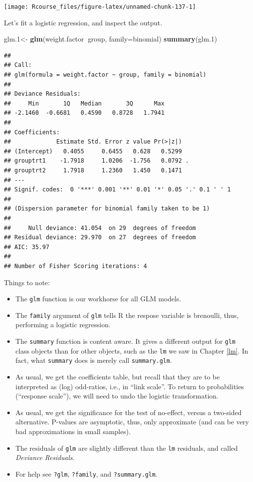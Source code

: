 \documentclass[]{book}
\newenvironment{Shaded}{\begin{snugshade}}{\end{snugshade}}
\newcommand{\KeywordTok}[1]{\textcolor[rgb]{0.13,0.29,0.53}{\textbf{#1}}}
\newcommand{\DataTypeTok}[1]{\textcolor[rgb]{0.13,0.29,0.53}{#1}}
\newcommand{\DecValTok}[1]{\textcolor[rgb]{0.00,0.00,0.81}{#1}}
\newcommand{\StringTok}[1]{\textcolor[rgb]{0.31,0.60,0.02}{#1}}
\newcommand{\OperatorTok}[1]{\textcolor[rgb]{0.81,0.36,0.00}{\textbf{#1}}}
\newcommand{\NormalTok}[1]{#1}
\providecommand{\tightlist}{%
  \setlength{\itemsep}{0pt}\setlength{\parskip}{0pt}}
\theoremstyle{definition}
\theoremstyle{definition}
\theoremstyle{definition}
\theoremstyle{remark}
\begin{document}
\texttt{[image: Rcourse\_files/figure-latex/unnamed-chunk-137-1]}

Let's fit a logistic regression, and inspect the output.

\begin{Shaded}
\begin{Highlighting}[]
\NormalTok{glm.}\DecValTok{1}\NormalTok{<-}\StringTok{ }\KeywordTok{glm}\NormalTok{(weight.factor}\OperatorTok{~}\NormalTok{group, }\DataTypeTok{family=}\NormalTok{binomial)}
\KeywordTok{summary}\NormalTok{(glm.}\DecValTok{1}\NormalTok{)}
\end{Highlighting}
\end{Shaded}

\begin{verbatim}
## 
## Call:
## glm(formula = weight.factor ~ group, family = binomial)
## 
## Deviance Residuals: 
##     Min       1Q   Median       3Q      Max  
## -2.1460  -0.6681   0.4590   0.8728   1.7941  
## 
## Coefficients:
##             Estimate Std. Error z value Pr(>|z|)  
## (Intercept)   0.4055     0.6455   0.628   0.5299  
## grouptrt1    -1.7918     1.0206  -1.756   0.0792 .
## grouptrt2     1.7918     1.2360   1.450   0.1471  
## ---
## Signif. codes:  0 '***' 0.001 '**' 0.01 '*' 0.05 '.' 0.1 ' ' 1
## 
## (Dispersion parameter for binomial family taken to be 1)
## 
##     Null deviance: 41.054  on 29  degrees of freedom
## Residual deviance: 29.970  on 27  degrees of freedom
## AIC: 35.97
## 
## Number of Fisher Scoring iterations: 4
\end{verbatim}

Things to note:

\begin{itemize}
\tightlist
\item
  The \texttt{glm} function is our workhorse for all GLM models.
\item
  The \texttt{family} argument of \texttt{glm} tells R the respose
  variable is brenoulli, thus, performing a logistic regression.
\item
  The \texttt{summary} function is content aware. It gives a different
  output for \texttt{glm} class objects than for other objects, such as
  the \texttt{lm} we saw in Chapter \ref{lm}. In fact, what
  \texttt{summary} does is merely call \texttt{summary.glm}.
\item
  As usual, we get the coefficients table, but recall that they are to
  be interpreted as (log) odd-ratios, i.e., in ``link scale''. To return
  to probabilities (``response scale''), we will need to undo the
  logistic transformation.
\item
  As usual, we get the significance for the test of no-effect, versus a
  two-sided alternative. P-values are asymptotic, thus, only approximate
  (and can be very bad approximations in small samples).
\item
  The residuals of \texttt{glm} are slightly different than the
  \texttt{lm} residuals, and called \emph{Deviance Residuals}.
\item
  For help see \texttt{?glm}, \texttt{?family}, and
  \texttt{?summary.glm}.
\end{itemize}
\end{document}
